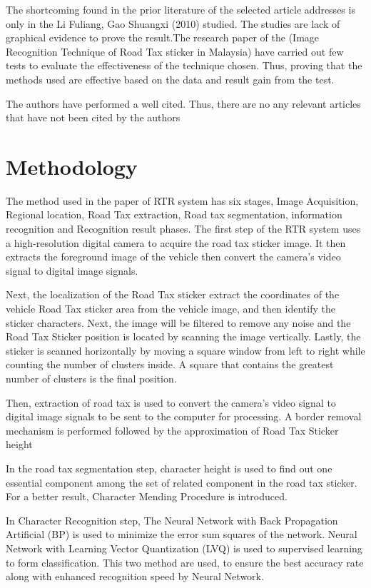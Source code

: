 \documentclass[12pt]{article}
\begin{document}
The shortcoming found in the prior literature of the selected article addresses is only in the Li Fuliang, Gao Shuangxi (2010) studied. The studies are lack of graphical evidence to prove the result.The research paper of the (Image Recognition Technique of Road Tax sticker in Malaysia) have carried out few tests to evaluate the effectiveness of the technique chosen. Thus, proving that the methods used are effective based on the data and result gain from the test.\cite{bpnn}

The authors have performed a well cited. Thus, there are no any relevant articles that have not been cited by the authors


\section{Methodology}
The method used in the paper of RTR system has six stages, Image Acquisition, Regional location, Road Tax extraction, Road tax segmentation, information recognition and Recognition result phases.
The first step of the RTR system uses a high-resolution digital camera to acquire the road tax sticker image. It then extracts the foreground image of the vehicle then convert the camera's video signal to digital image signals. \cite{par}

Next, the localization of the Road Tax sticker extract the coordinates of the vehicle Road Tax sticker area from the vehicle image, and then identify the sticker characters. Next, the image will be filtered to remove any noise and the Road Tax Sticker position is located by scanning the image vertically. Lastly, the sticker is scanned horizontally by moving a square window from left to right while counting the number of clusters inside. A square that contains the greatest number of clusters is the final position.   

Then, extraction of road tax is used to convert the camera's video signal to digital image signals to be sent to the computer for processing. A border removal mechanism is performed followed by the approximation of Road Tax Sticker height  

In the road tax segmentation step, character height is used to find out one essential component among the set of related component in the road tax sticker. For a better result, Character Mending Procedure is introduced.

In Character Recognition step, The Neural Network with Back Propagation Artificial (BP) is used to minimize the error sum squares of the network. Neural Network with Learning Vector Quantization (LVQ) is used to supervised learning to form classification. This two method are used, to ensure the best accuracy rate along with enhanced recognition speed by Neural Network.\cite{location}\cite{bpnn}
\end{document}
